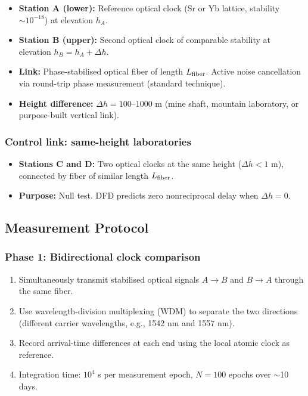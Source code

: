 \documentclass[12pt,a4paper,twocolumn]{article}
\begin{document}
\begin{itemize}[nosep]
\item \textbf{Station A (lower):} Reference optical clock
(Sr or Yb lattice, stability $\sim 10^{-18}$) at elevation $h_A$.
\item \textbf{Station B (upper):} Second optical clock of
comparable stability at elevation $h_B = h_A + \Delta h$.
\item \textbf{Link:} Phase-stabilised optical fiber of length
$L_{\rm fiber}$.  Active noise cancellation via round-trip
phase measurement (standard technique).
\item \textbf{Height difference:} $\Delta h = 100$--$1000$ m
(mine shaft, mountain laboratory, or purpose-built vertical link).
\end{itemize}

\subsubsection{Control link: same-height laboratories}

\begin{itemize}[nosep]
\item \textbf{Stations C and D:} Two optical clocks at the same
height ($\Delta h < 1$ m), connected by fiber of similar length
$L_{\rm fiber}$.
\item \textbf{Purpose:} Null test.  DFD predicts zero nonreciprocal
delay when $\Delta h = 0$.
\end{itemize}

\subsection{Measurement Protocol}

\subsubsection{Phase 1: Bidirectional clock comparison}

\begin{enumerate}[nosep]
\item Simultaneously transmit stabilised optical signals
$A\to B$ and $B\to A$ through the same fiber.
\item Use wavelength-division multiplexing (WDM) to separate
the two directions (different carrier wavelengths, e.g.,
1542 nm and 1557 nm).
\item Record arrival-time differences at each end using the
local atomic clock as reference.
\item Integration time: $10^4$ s per measurement epoch,
$N = 100$ epochs over $\sim$10 days.
\end{enumerate}
\end{document}
